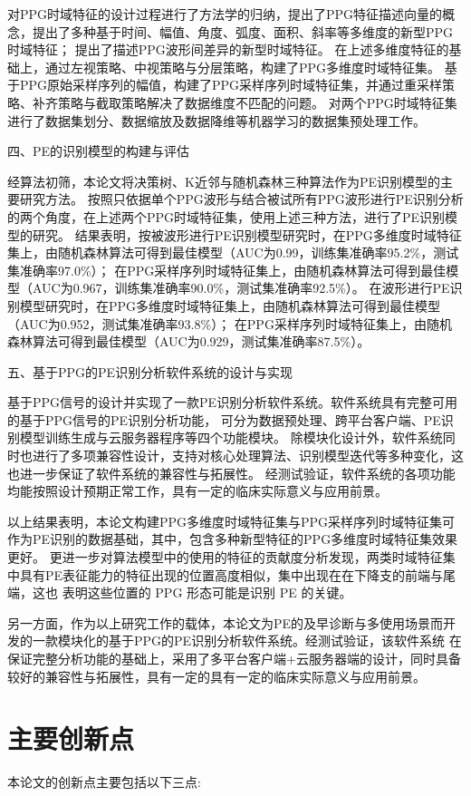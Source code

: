 对PPG时域特征的设计过程进行了方法学的归纳，提出了PPG特征描述向量的概念，提出了多种基于时间、幅值、角度、弧度、面积、斜率等多维度的新型PPG时域特征；
提出了描述PPG波形间差异的新型时域特征。
在上述多维度特征的基础上，通过左视策略、中视策略与分层策略，构建了PPG多维度时域特征集。
基于PPG原始采样序列的幅值，构建了PPG采样序列时域特征集，并通过重采样策略、补齐策略与截取策略解决了数据维度不匹配的问题。
对两个PPG时域特征集进行了数据集划分、数据缩放及数据降维等机器学习的数据集预处理工作。

四、PE的识别模型的构建与评估

经算法初筛，本论文将决策树、K近邻与随机森林三种算法作为PE识别模型的主要研究方法。
按照只依据单个PPG波形与结合被试所有PPG波形进行PE识别分析的两个角度，在上述两个PPG时域特征集，使用上述三种方法，进行了PE识别模型的研究。
结果表明，按被波形进行PE识别模型研究时，在PPG多维度时域特征集上，由随机森林算法可得到最佳模型（AUC为0.99，训练集准确率95.2\%，测试集准确率97.0\%）；
在PPG采样序列时域特征集上，由随机森林算法可得到最佳模型（AUC为0.967，训练集准确率90.0\%，测试集准确率92.5\%）。
在波形进行PE识别模型研究时，在PPG多维度时域特征集上，由随机森林算法可得到最佳模型（AUC为0.952，测试集准确率93.8\%）；
在PPG采样序列时域特征集上，由随机森林算法可得到最佳模型（AUC为0.929，测试集准确率87.5\%）。

五、基于PPG的PE识别分析软件系统的设计与实现

基于PPG信号的设计并实现了一款PE识别分析软件系统。软件系统具有完整可用的基于PPG信号的PE识别分析功能，
可分为数据预处理、跨平台客户端、PE识别模型训练生成与云服务器程序等四个功能模块。
除模块化设计外，软件系统同时也进行了多项兼容性设计，支持对核心处理算法、识别模型迭代等多种变化，这也进一步保证了软件系统的兼容性与拓展性。
经测试验证，软件系统的各项功能均能按照设计预期正常工作，具有一定的临床实际意义与应用前景。

以上结果表明，本论文构建PPG多维度时域特征集与PPG采样序列时域特征集可作为PE识别的数据基础，其中，包含多种新型特征的PPG多维度时域特征集效果更好。
更进一步对算法模型中的使用的特征的贡献度分析发现，两类时域特征集中具有PE表征能力的特征出现的位置高度相似，集中出现在在下降支的前端与尾端，这也
表明这些位置的 PPG 形态可能是识别 PE 的关键。

另一方面，作为以上研究工作的载体，本论文为PE的及早诊断与多使用场景而开发的一款模块化的基于PPG的PE识别分析软件系统。经测试验证，该软件系统
在保证完整分析功能的基础上，采用了多平台客户端+云服务器端的设计，同时具备较好的兼容性与拓展性，具有一定的具有一定的临床实际意义与应用前景。
\section{主要创新点}
本论文的创新点主要包括以下三点:

